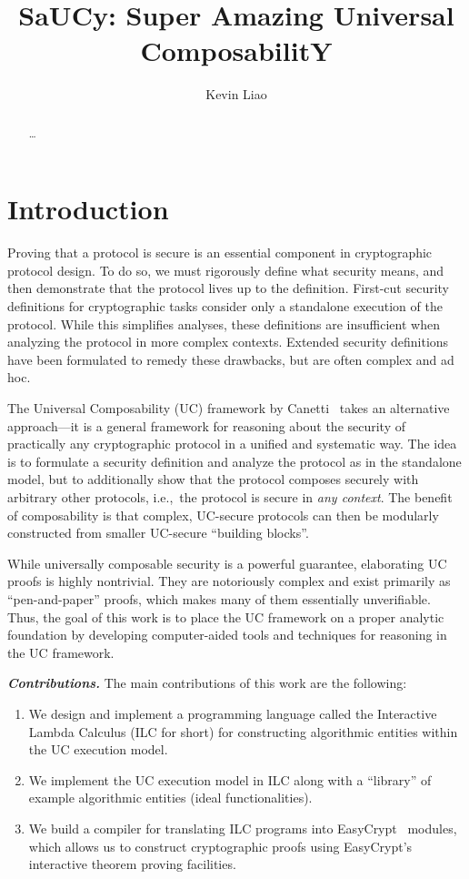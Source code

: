 \documentclass{llncs}
\title{SaUCy: Super Amazing Universal ComposabilitY}
\author{Kevin Liao}
\institute{}
\newcommand{\parheader}[1]{\noindent\emph{\textbf{{#1}.}}}
\begin{document}
\maketitle

\begin{abstract}
\ldots
\end{abstract}

\section{Introduction}

Proving that a protocol is secure is an essential component in cryptographic
protocol design. To do so, we must rigorously define what security means, and
then demonstrate that the protocol lives up to the definition. First-cut security
definitions for cryptographic tasks consider only a standalone execution of the
protocol. While this simplifies analyses, these definitions are insufficient
when analyzing the protocol in more complex contexts. Extended security
definitions have been formulated to remedy these drawbacks, but are often
complex and ad hoc.

The Universal Composability (UC) framework by
Canetti~\cite{canetti2001universally} takes an alternative approach---it is a
general framework for reasoning about the security of practically any
cryptographic protocol in a unified and systematic way. The idea is to formulate
a security definition and analyze the protocol as in the standalone model, but
to additionally show that the protocol composes securely with arbitrary other
protocols, i.e.,\ the protocol is secure in \emph{any context}. The benefit of
composability is that complex, UC-secure protocols can then be modularly
constructed from smaller UC-secure ``building blocks''.

While universally composable security is a powerful guarantee, elaborating UC
proofs is highly nontrivial. They are notoriously complex and exist primarily as
``pen-and-paper'' proofs, which makes many of them essentially
unverifiable. Thus, the goal of this work is to place the UC framework on a
proper analytic foundation by developing computer-aided tools and techniques for
reasoning in the UC framework.\smallskip

\parheader{Contributions} The main contributions of this work are the
following:
\begin{enumerate}
\item We design and implement a programming language called the Interactive
Lambda Calculus (ILC for short) for constructing algorithmic entities within the
UC execution model.
\item We implement the UC execution model in ILC along with a ``library'' of
example algorithmic entities (ideal functionalities).
\item We build a compiler for translating ILC programs into
EasyCrypt~\cite{barthe2011computer} modules, which allows us to construct
cryptographic proofs using EasyCrypt's interactive theorem proving facilities.
\end{enumerate}
\end{document}
